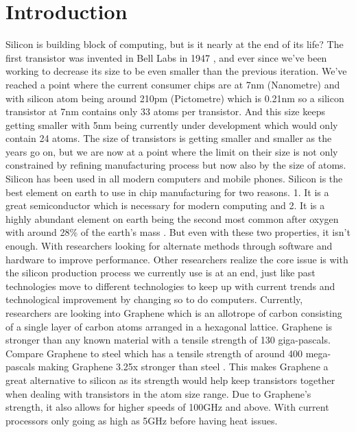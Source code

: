 \documentclass[journal]{IEEEtran}
\begin{document}
\section{Introduction}
Silicon is building block of computing, but is it nearly at the end of its life? The first transistor was invented in Bell Labs in 1947 \cite{8896076320180101}, and ever since we've been working to decrease its size to be even smaller than the previous iteration. We've reached a point where the current consumer chips are at 7nm (Nanometre) and with silicon atom \cite{8947487520180101} being around 210pm (Pictometre) which is 0.21nm so a silicon transistor at 7nm contains only 33 atoms per transistor. And this size keeps getting smaller with 5nm being currently under development which would only contain 24 atoms. The size of transistors is getting smaller and smaller as the years go on, but we are now at a point where the limit on their size is not only constrained by refining manufacturing process but now also by the size of atoms. Silicon has been used in all modern computers and mobile phones. Silicon is the best element on earth to use in chip manufacturing for two reasons. 1. It is a great semiconductor which is necessary for modern computing and 2. It is a highly abundant element on earth being the second most common after oxygen with around 28\% of the earth's mass \cite{8947487520180101}. But even with these two properties, it isn't enough. With researchers looking for alternate methods through software and hardware to improve performance. Other researchers realize the core issue is with the silicon production process we currently use is at an end, just like past technologies move to different technologies to keep up with current trends and technological improvement by changing so to do computers. Currently, researchers are looking into Graphene \cite{nicol_2018} which is an allotrope of carbon consisting of a single layer of carbon atoms arranged in a hexagonal lattice. Graphene is stronger than any known material with a tensile strength of 130 giga-pascals. Compare Graphene to steel which has a tensile strength of around 400 mega-pascals making Graphene 3.25x stronger than steel \cite{dume_2008}. This makes Graphene a great alternative to silicon as its strength would help keep transistors together when dealing with transistors in the atom size range. Due to Graphene's strength, it also allows for higher speeds of 100GHz \cite{johnson_2010} and above. With current processors only going as high as 5GHz before having heat issues.
\end{document}

